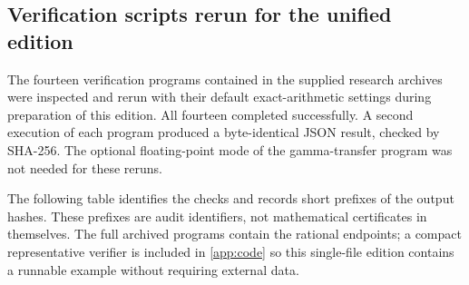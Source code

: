 \documentclass[11pt,a4paper]{article}
\numberwithin{equation}{section}
\theoremstyle{definition}
\theoremstyle{remark}
\begin{document}
\subsection{Verification scripts rerun for the unified edition}
The fourteen verification programs contained in the supplied research
archives were inspected and rerun with their default exact-arithmetic
settings during preparation of this edition. All fourteen completed
successfully. A second execution of each program produced a byte-identical
JSON result, checked by SHA-256. The optional floating-point mode of the
gamma-transfer program was not needed for these reruns.

The following table identifies the checks and records short prefixes of
the output hashes. These prefixes are audit identifiers, not mathematical
certificates in themselves. The full archived programs contain the
rational endpoints; a compact representative verifier is included in
\cref{app:code} so this single-file edition contains a runnable example
without requiring external data.
\end{document}
